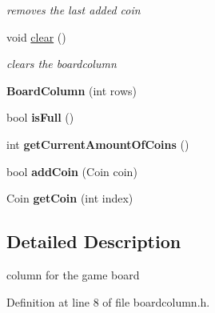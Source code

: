 \begin{DoxyCompactItemize}
\begin{DoxyCompactList}\small\item\em removes the last added coin \end{DoxyCompactList}\item 
\hypertarget{class_board_column_a316e15e6e992dc3e0bba17289bad228a}{void \hyperlink{class_board_column_a316e15e6e992dc3e0bba17289bad228a}{clear} ()}\label{class_board_column_a316e15e6e992dc3e0bba17289bad228a}

\begin{DoxyCompactList}\small\item\em clears the boardcolumn \end{DoxyCompactList}\item 
\hypertarget{class_board_column_a8f088cd71325ffbdc839c101ca6a4fda}{{\bfseries Board\-Column} (int rows)}\label{class_board_column_a8f088cd71325ffbdc839c101ca6a4fda}

\item 
\hypertarget{class_board_column_adb1521008180835bd37572a1cda02ef8}{bool {\bfseries is\-Full} ()}\label{class_board_column_adb1521008180835bd37572a1cda02ef8}

\item 
\hypertarget{class_board_column_a09589c8bd6912dab8a7fb27500002553}{int {\bfseries get\-Current\-Amount\-Of\-Coins} ()}\label{class_board_column_a09589c8bd6912dab8a7fb27500002553}

\item 
\hypertarget{class_board_column_a060fd86473c5df6a98449e317bc2a364}{bool {\bfseries add\-Coin} (Coin coin)}\label{class_board_column_a060fd86473c5df6a98449e317bc2a364}

\item 
\hypertarget{class_board_column_a8b8107a2cb462ffd73d484b6e1d9b359}{Coin {\bfseries get\-Coin} (int index)}\label{class_board_column_a8b8107a2cb462ffd73d484b6e1d9b359}

\end{DoxyCompactItemize}


\subsection{Detailed Description}
column for the game board 

Definition at line 8 of file boardcolumn.\-h.



